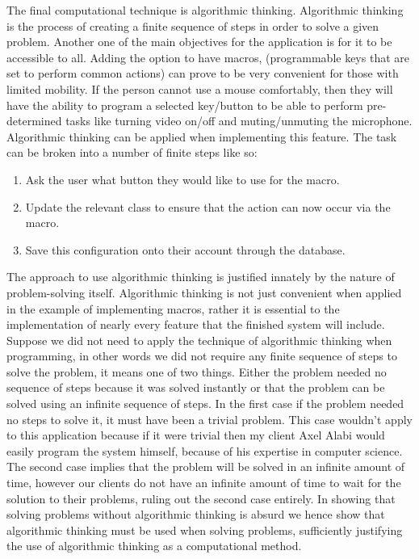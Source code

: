 The final computational technique is algorithmic thinking.
Algorithmic thinking is the process of creating a finite
sequence of steps in order to solve a given problem. Another
one of the main objectives for the application is for it to be
accessible to all. Adding the option to have macros,
(programmable keys that are set to perform common actions)
can prove to be very convenient for those with limited
mobility. If the person cannot use a mouse comfortably, then
they will have the ability to program a selected key/button to
be able to perform pre-determined tasks like turning video
on/off and muting/unmuting the microphone. Algorithmic thinking
can be applied when implementing this feature. The task can
be broken into a number of finite steps like so: \\

\begin{enumerate}
  \item Ask the user what button they would like to use for the macro.
  \item Update the relevant class to ensure that the action can now occur via the macro.
  \item Save this configuration onto their account through the database.
\end{enumerate}

The approach to use algorithmic thinking is justified innately
by the nature of problem-solving itself. Algorithmic thinking
is not just convenient when applied in the example of
implementing
macros, rather it is essential to the implementation of nearly
every feature that the finished system will include. Suppose
we did not need to apply the technique of algorithmic
thinking when programming, in other words we did not require
any finite sequence of steps to solve the problem, it means
one of two things. Either the problem needed no sequence of
steps because it was solved instantly or that the problem
can be solved
using an infinite sequence of steps. In the first case if the
problem needed no steps to solve it, it must have been a
trivial problem. This case wouldn't apply to this application
because if it were trivial then my client Axel Alabi would
easily program the system himself, because of his expertise in
computer science. The second case implies that the problem will
be solved in an infinite amount of time, however our clients
do not have an infinite amount of time to wait for the
solution to their problems, ruling out the second case
entirely. In showing that solving problems without algorithmic
thinking is absurd we hence show that algorithmic thinking
must be used when solving problems, sufficiently justifying
the use of algorithmic thinking as a computational method.\\
\vspace{0.2cm}

